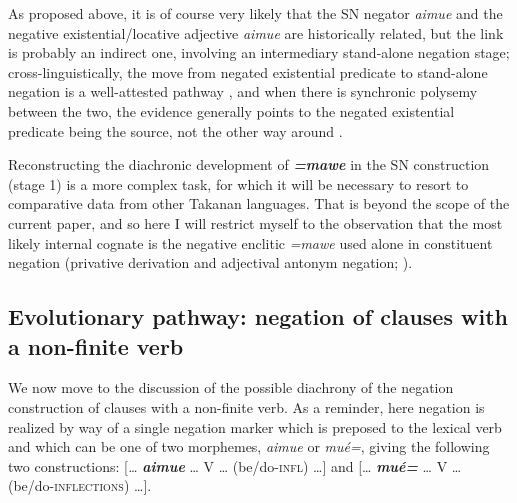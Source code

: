 \documentclass[output=paper]{langsci/langscibook}
\begin{document}
As proposed above, it is of course very likely that the SN negator
\textit{aimue} and the negative existential\slash locative adjective
\textit{aimue} are historically related, but the link is probably an
indirect one, involving an intermediary stand-alone negation stage;
cross-linguistically, the move from negated existential predicate to
stand-alone negation is a well-attested pathway 
\parencites[10,
13--14]{Croft1991}[127ff]{Veselinova2013}[155--156]{Veselinova2016},
and when there is synchronic polysemy between the two, the evidence
generally points to the negated existential predicate being the source, not
the other way around \citep[8]{Croft1991}.

Reconstructing the diachronic development of \textbf{\textit{=mawe}} in the
SN construction (stage 1) is a more complex task, for which it will be
necessary to resort to comparative data from other Takanan languages. That
is beyond the scope of the current paper, and so here I will restrict
myself to the observation that the most likely internal cognate is the
negative
enclitic \textit{=mawe} used alone in constituent negation (privative
derivation and adjectival antonym negation; ).

\subsection{Evolutionary pathway: negation of clauses with a non-finite
verb}\label{sec:tacana-10.2}

We now move to the discussion of the possible diachrony of the negation construction of clauses with a non-finite verb. As a reminder, here negation is realized by way of a single negation marker which is preposed to the lexical verb and which can be one of two morphemes, \textit{aimue} or \textit{mué=}, giving the following two constructions: [\textit{…} \textbf{\textit{aimue}} … V … (be/do-\textsc{infl}) …] and [… \textbf{\textit{mué=}} … V … (be/do-\textsc{inflections}) …].
\end{document}

